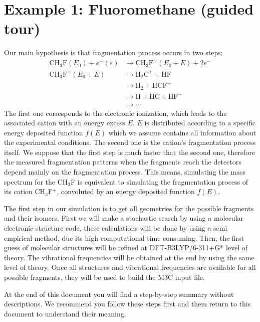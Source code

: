 \documentclass[a4paper,12pt]{article}
\begin{document}
\section{Example 1: Fluoromethane (guided tour)}

Our main hypothesis is that fragmentation process occurs in two steps:
\begin{equation}
\begin{aligned}
\text{C}\text{H}_3\text{F}(E_0)
+ e^{-}(\varepsilon)
&\rightarrow
\text{C}\text{H}_3\text{F}^+(E_0+E) + 2e^-
\\[4mm]
\text{C}\text{H}_3\text{F}^+(E_0+E)
&\rightarrow
\text{H}_2\text{C}^+ + \text{HF}
\\
&\rightarrow
\text{H}_2 + \text{HCF}^+
\\
&\rightarrow
\text{H} + \text{HC} + \text{HF}^+
\\
&\rightarrow \cdots
\end{aligned}
\end{equation}
The first one corresponds to the
electronic ionization, which leads to the associated cation with an energy excess $E$. $E$ is
distributed according to a specific energy deposited function $f(E)$ which we assume contains all information about
the experimental conditions. The second one is the cation's fragmentation process itself. We suppose
that the first step is much faster that the second one, therefore the measured fragmentation patterns
when the fragments reach the detectors depend mainly on the fragmentation process.
This means, simulating the mass spectrum for the CH$_3$F is equivalent to simulating the fragmentation process
of its cation CH$_3$F$^+$, convoluted by an energy deposited function $f(E)$.

The first step in our simulation is to get all geometries for the possible fragments and their isomers. First we will
make a stochastic search by using a molecular electronic structure code, these calculations will be done by using a
semi empirical method, due its high computational time consuming. Then, the first guess of molecular structures will
be refined at DFT-B3LYP/6-311+G* level of theory. The vibrational frequencies will be obtained at the end by using the
same level of theory. Once all structures and vibrational frequencies are available for all possible fragments, they
will be used to build the M3C input file.

At the end of this document you will find a step-by-step summary without descriptions. We recommend you follow
these steps first and them return to this document to understand their meaning.
\end{document}
